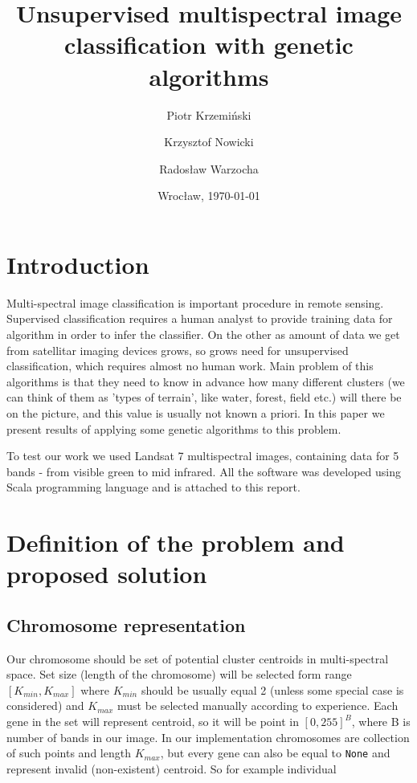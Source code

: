 \documentclass[11pt,leqno]{article}
\title{{\textbf{Unsupervised multispectral image classification with genetic algorithms}}}
\author{Piotr Krzemiński \and Krzysztof Nowicki \and Radosław Warzocha}
\date{Wrocław, \today}
\theoremstyle{mytheoremstyle}
\theoremstyle{mytheoremstyle}
\begin{document}
\maketitle
\thispagestyle{empty}

\vspace{5cm}

\section{Introduction}

Multi-spectral image classification is important procedure in remote sensing. Supervised classification requires a human analyst to provide training data for algorithm in order to infer the classifier. On the other as amount of data we get from satellitar imaging devices grows, so grows need for unsupervised classification, which requires almost no human work. Main problem of this algorithms is that they need to know in advance how many different clusters (we can think of them as 'types of terrain', like water, forest, field etc.) will there be on the picture, and this value is usually not known a priori. In this paper we present results of applying some genetic algorithms to this problem.

To test our work we used Landsat 7 multispectral images, containing data for 5  bands - from visible green to mid infrared. All the software was developed using Scala programming language and is attached to this report.

\section{Definition of the problem and proposed solution}

\subsection{Chromosome representation}

Our chromosome should be set of potential cluster centroids in multi-spectral space. Set size (length of the chromosome) will be selected form range $[K_{min}, K_{max}]$ where $K_{min}$ should be usually equal 2 (unless some special case is considered) and $K_{max}$ must be selected manually according to experience. Each gene in the set will represent centroid, so it will be point in $[0,255]^B$, where B is number of bands in our image. In our implementation chromosomes are collection of such points and length $K_{max}$, but every gene can also be equal to \texttt{None} and represent invalid (non-existent) centroid. So for example individual
\end{document}
